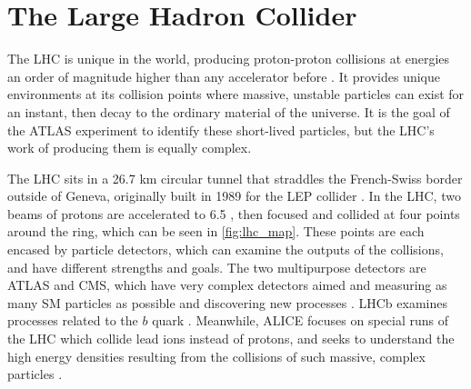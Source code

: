 
\chapter{The Large Hadron Collider} %

\label{ch:lhc} %


The \ac{LHC} is unique in the world, producing proton-proton collisions at energies an order of magnitude higher than any accelerator before \cite{1748-0221-3-08-S08001}. It provides unique environments at its collision points where massive, unstable particles can exist for an instant, then decay to the ordinary material of the universe. It is the goal of the ATLAS experiment to identify these short-lived particles, but the \ac{LHC}'s work of producing them is equally complex. 

The \ac{LHC} sits in a 26.7 km circular tunnel that straddles the French-Swiss border outside of Geneva, originally built in 1989 for the \ac{LEP} collider \cite{lep_tdr}. In the \ac{LHC}, two beams of protons are accelerated to 6.5 \tev, then focused and collided at four points around the ring, which can be seen in \autoref{fig:lhc_map}. These points are each encased by particle detectors, which can examine the outputs of the collisions, and have different strengths and goals. The two multipurpose detectors are ATLAS and \ac{CMS}, which have very complex detectors aimed and measuring as many \ac{SM} particles as possible and discovering new processes \cite{PERF-2007-01, 1748-0221-3-08-S08004}. \ac{LHCb} examines processes related to the $b$ quark \cite{1748-0221-3-08-S08005}. Meanwhile, \ac{ALICE} focuses on special runs of the \ac{LHC} which collide lead ions instead of protons, and seeks to understand the high energy densities resulting from the collisions of such massive, complex particles \cite{1748-0221-3-08-S08002}. 


